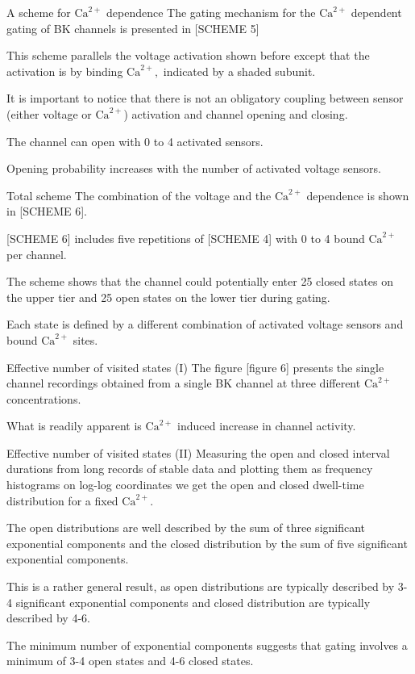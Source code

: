 \documentclass[t]{beamer}
\newcommand{\ca}{\text{Ca}^{2+}}
\begin{document}
\begin{frame}{A scheme for $\ca$ dependence} 
The gating mechanism for the $\ca$ dependent gating of BK channels is presented in [SCHEME 5]

This scheme parallels the voltage activation shown before except that the activation is by binding $\ca,$ indicated by a shaded subunit.

It is important to notice that there is not an obligatory coupling between sensor (either voltage or $\ca$) activation and channel opening and closing.

The channel can open with 0 to 4 activated sensors. 

Opening probability increases with the number of activated voltage sensors.


\end{frame}

\begin{frame}{Total scheme}
The combination of the voltage and the $\ca$ dependence is shown in [SCHEME 6].

[SCHEME 6] includes five repetitions of [SCHEME 4] with 0 to 4 bound $\ca$ per channel.

The scheme shows that the channel could potentially enter 25 closed states on the upper tier and 25 open states on the lower tier during gating.

Each state is defined by a different combination of activated voltage sensors and bound $\ca$ sites.
\end{frame}

\begin{frame}{Effective number of visited states (I)}
The figure [figure 6] presents the single channel recordings obtained from a single BK channel at three different $\ca$ concentrations.

What is readily apparent is $\ca$ induced increase in channel activity.


\end{frame}


\begin{frame}{Effective number of visited states (II)}
Measuring the open and closed interval durations from long records of stable data and plotting them as frequency histograms on log-log coordinates we get the open and closed dwell-time distribution for a fixed $\ca.$

The open distributions are well described by the sum of three significant exponential components and the closed distribution by the sum of five significant exponential components.

This is a rather general result, as open distributions are typically described by 3-4 significant exponential components and closed distribution are typically described by 4-6.

The minimum number of exponential components suggests that gating involves a minimum of 3-4 open states and 4-6 closed states.

\end{frame}
\end{document}
